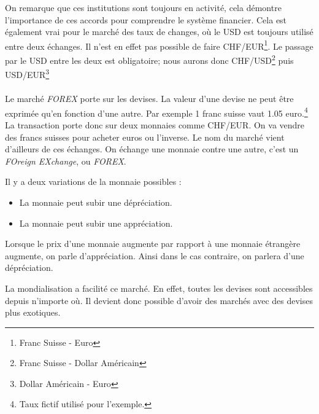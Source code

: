 \documentclass[a4paper, 11pt]{article}
\begin{document}
On remarque que ces institutions sont toujours en activité, cela démontre l'importance de ces accords pour comprendre le système financier. Cela est également vrai pour le marché des taux de changes, où le USD est toujours utilisé entre deux échanges.
Il n'est en effet pas possible de faire CHF/EUR\footnote{Franc Suisse - Euro}. Le passage par le USD entre les deux est obligatoire; nous aurons donc CHF/USD\footnote{Franc Suisse - Dollar Américain} puis USD/EUR\footnote{Dollar Américain - Euro}

\paragraph{}
Le marché \textit{FOREX} porte sur les devises. La valeur d'une devise ne peut être exprimée qu'en fonction d'une autre. Par exemple 1 franc suisse vaut 1.05 euro.\footnote{Taux fictif utilisé pour l'exemple.}
La transaction porte donc sur deux monnaies comme CHF/EUR. On va vendre des francs suisses pour acheter euros ou l'inverse.
Le nom du marché vient d'ailleurs de ces échanges. On échange une monnaie contre une autre, c'est un \textit{FOreign EXchange}, ou \textit{FOREX}.

Il y a deux variations de la monnaie possibles :
\begin{itemize}
\item La monnaie peut subir une dépréciation.
\item La monnaie peut subir une appréciation.
\end{itemize}
Lorsque le prix d'une monnaie augmente par rapport à une monnaie étrangère augmente, on parle d'appréciation. Ainsi dans le cas contraire, on parlera d'une dépréciation.

La mondialisation a facilité ce marché. En effet, toutes les devises sont accessibles depuis n'importe où. Il devient donc possible d'avoir des marchés avec des devises plus exotiques.
\end{document}
